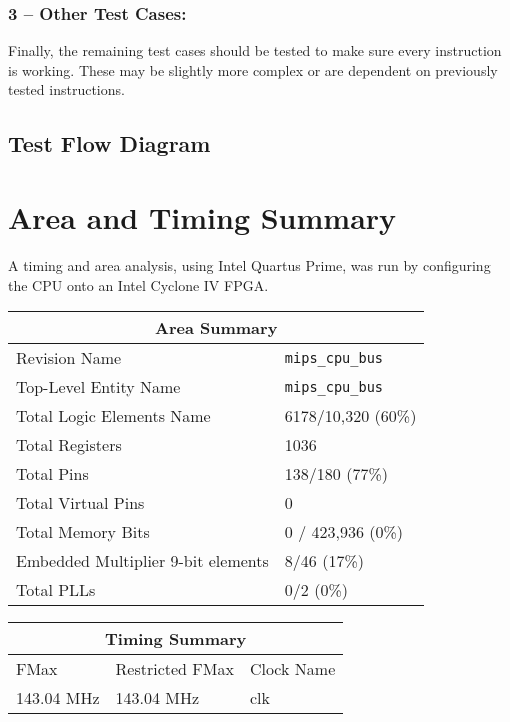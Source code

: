 \documentclass{article}
\begin{document}
\subsubsection{3 – Other Test Cases:}
Finally, the remaining test cases should be tested to make sure every instruction is working. These may be slightly more complex or are dependent on previously tested instructions.


\subsection{Test Flow Diagram}

\begin{figure} [htp!]
    \centering
    \qquad

    \label{fig:example}%
\end{figure}


\section{Area and Timing Summary} 

A timing and area analysis, using Intel Quartus Prime, was run by configuring the CPU onto an Intel Cyclone IV FPGA. 

\hfill \break

\begin{tabular}[htp!]{ |p{5.95cm}|p{5.95cm}|}
\hline
\multicolumn{2}{|c|}{Area Summary} \\
\hline
Revision Name & \texttt{mips\_cpu\_bus}  \\
Top-Level Entity Name & \texttt{mips\_cpu\_bus} \\
Total Logic Elements Name & 6178/10,320 (60\%)  \\
Total Registers & 1036 \\
Total Pins & 138/180 (77\%) \\
Total Virtual Pins & 0  \\
Total Memory Bits & 0 / 423,936 (0\%) \\
Embedded Multiplier 9-bit elements & 8/46 (17\%)\\
Total PLLs & 0/2 (0\%)  \\
\hline
\end{tabular}

\hfill \break

\begin{tabular}{ |p{3cm}|p{3cm}|p{3cm}|  }
\hline
\multicolumn{3}{|c|}{Timing Summary} \\
\hline
FMax& Restricted FMax & Clock Name \\
\hline
143.04 MHz & 143.04 MHz & clk \\
\hline
\end{tabular}
\hfill \break
\hfill \break
\end{document}
